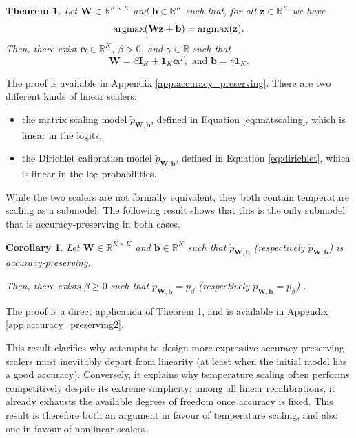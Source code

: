 \documentclass[10pt,dvipsnames]{article}
\newcommand{\bz}{\mathbf{z}}%
\newcommand{\bW}{\mathbf{W}}%
\newcommand{\bb}{\mathbf{b}}%
\newcommand{\ba}{\boldsymbol{\alpha}}%
\newcommand{\bI}{\mathbf{I}}%
\newcommand{\bun}{\mathbf{1}}%
\theoremstyle{plain}
\newtheorem{theorem}{Theorem}[section]
\newtheorem{corollary}{Corollary}
\theoremstyle{definition}
\theoremstyle{remark}
\begin{document}
\begin{theorem}
\label{th:accuracy_preserving}
    Let $\bW \in \mathbb{R}^{K \times K}$ and  $\bb \in \mathbb{R}^K$ such that, for all $\bz \in \mathbb{R}^K$ we have
    \begin{equation}
    \label{eq:invariance}
        \textup{argmax}(\bW \bz+\bb) = \textup{argmax}(\bz).
    \end{equation}
Then, there exist $\ba \in \mathbb{R}^K$, $\beta> 0$, and $\gamma \in \mathbb{R}$ such that
\begin{equation}
    \bW = \beta \bI_K + \bun_K \ba ^T, \text{ and } \bb = \gamma \bun_K.
\end{equation}
\end{theorem}
The proof is available in Appendix \ref{app:accuracy_preserving}. There are two different kinds of linear scalers:
\begin{itemize}[noitemsep,leftmargin=*]
    \item the matrix scaling model $\tilde{p}_{\bW,\bb}$, defined in Equation \eqref{eq:matscaling}, which is linear in the logits,
    \item the Dirichlet calibration model $\check{p}_{\bW,\bb}$, defined in Equation \eqref{eq:dirichlet}, which is linear in the log-probabilities.
\end{itemize}
While the two scalers are not formally equivalent, they both contain temperature scaling as a submodel. The following result shows that this is the only submodel that is accuracy-preserving in both cases.



\begin{corollary}
\label{cor:accuracy_preserving} 
   Let  $\bW \in \mathbb{R}^{K \times K}$ and  $\bb \in \mathbb{R}^K$ such that $\tilde{p}_{\bW,\bb}$ (respectively $\check{p}_{\bW,\bb}$) is accuracy-preserving.
   
   Then, there exists $\beta \geq 0$ such that $\tilde{p}_{\bW,\bb} = p_{\beta}$ (respectively $\check{p}_{\bW,\bb} = p_{\beta}$) .
\end{corollary}

The proof is a direct application of Theorem \ref{th:accuracy_preserving}, and is available in Appendix \ref{app:accuracy_preserving2}.

This result clarifies why attempts to design more expressive accuracy-preserving scalers must inevitably depart from linearity (at least when the initial model has a good accuracy). Conversely, it explains why temperature scaling often performs competitively despite its extreme simplicity: among all linear recalibrations, it already exhausts the available degrees of freedom once accuracy is fixed. This result is therefore both an argument in favour of temperature scaling, and also one in favour of nonlinear scalers. 
\end{document}
